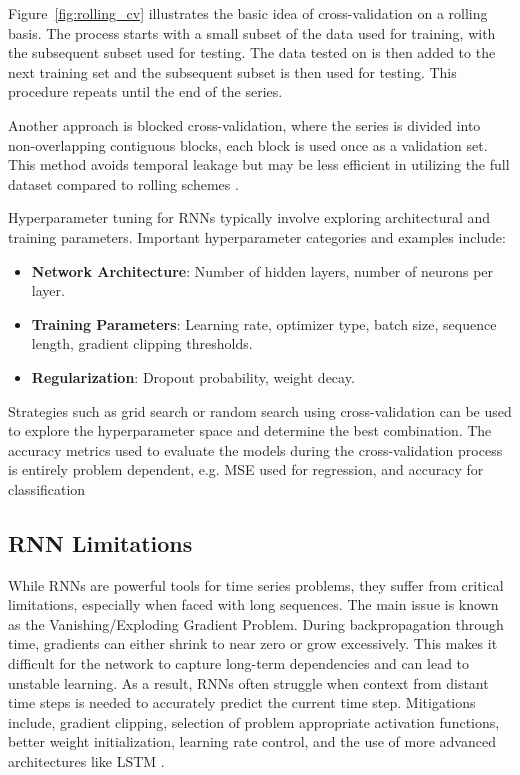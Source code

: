 \documentclass[conference]{IEEEtran}
\begin{document}
Figure~\ref{fig:rolling_cv} illustrates the basic idea of cross-validation on a rolling basis. The process starts with a small subset of the data used for training, with the subsequent subset used for testing. The data tested on is then added to the next training set and the subsequent subset is then used for testing. This procedure repeats until the end of the series.

Another approach is blocked cross-validation, where the series is divided into non-overlapping contiguous blocks, each block is used once as a validation set. This method avoids temporal leakage but may be less efficient in utilizing the full dataset compared to rolling schemes \cite{time_series_cv}.

Hyperparameter tuning for RNNs typically involve exploring architectural and training parameters. Important hyperparameter categories and examples include:

\begin{itemize}
    \item \textbf{Network Architecture}: Number of hidden layers, number of neurons per layer.
    \item \textbf{Training Parameters}: Learning rate, optimizer type, batch size, sequence length, gradient clipping thresholds.
    \item \textbf{Regularization}: Dropout probability, weight decay.
\end{itemize}

Strategies such as grid search or random search using cross-validation can be used to explore the hyperparameter space and determine the best combination. The accuracy metrics used to evaluate the models during the cross-validation process is entirely problem dependent, e.g. MSE used for regression, and accuracy for classification

\subsection{\textbf{RNN Limitations}}

While RNNs are powerful tools for time series problems, they suffer from critical limitations, especially when faced with long sequences. The main issue is known as the Vanishing/Exploding Gradient Problem. During backpropagation through time, gradients can either shrink to near zero or grow excessively. This makes it difficult for the network to capture long-term dependencies and can lead to unstable learning. As a result, RNNs often struggle when context from distant time steps is needed to accurately predict the current time step. Mitigations include, gradient clipping, selection of problem appropriate activation functions, better weight initialization, learning rate control, and the use of more advanced architectures like LSTM \cite{rnn_problems}.
\end{document}
